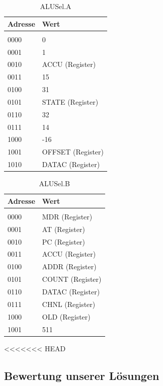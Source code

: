 \documentclass[12pt,titlepage]{article}
\begin{document}
\begin{table}[h!]
    \begin{tabular}{l|l}
    Adresse & Wert              \\
    \hline  					\\
    0000     & 0                 \\
    0001     & 1                 \\
    0010     & ACCU (Register)   \\
    0011     & 15                \\
    0100     & 31                \\
    0101     & STATE (Register)  \\
    0110     & 32                \\
    0111     & 14                \\
    1000     & -16               \\
    1001     & OFFSET (Register) \\
    1010     & DATAC (Register)  \\
    \end{tabular}
    \caption{ALUSel.A}
\end{table}

\begin{table}[h!]
    \begin{tabular}{l|l}
    Adresse & Wert            \\
    \hline                    \\
    0000     & MDR (Register)  \\
    0001     & AT (Register)   \\
    0010     & PC (Register)   \\
    0011     & ACCU (Register) \\
    0100     & ADDR (Register) \\
    0101     & COUNT (Register) \\
    0110     & DATAC (Register) \\
    0111     & CHNL (Register) \\
    1000     & OLD (Register)  \\
    1001     & 511             \\
    \end{tabular}
    \caption{ALUSel.B}
\end{table}

<<<<<<< HEAD
\subsection{Bewertung unserer Lösungen}
\end{document}
